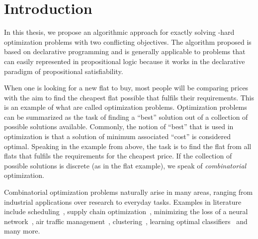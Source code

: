 \chapter{Introduction\label{chap:intro}}

In this thesis, we propose an algorithmic approach for exactly solving \NP-hard optimization problems with two conflicting objectives.
The algorithm proposed is based on declarative programming and is generally applicable to problems that can easily represented in propositional logic because it works in the declarative paradigm of propositional satisfiability.

When one is looking for a new flat to buy, most people will be comparing prices with the aim to find the cheapest flat possible that fulfils their requirements.
This is an example of what are called optimization problems.
Optimization problems can be summarized as the task of finding a ``best'' solution out of a collection of possible solutions available.
Commonly, the notion of ``best'' that is used in optimization is that a solution of minimum associated ``cost'' is considered optimal.
Speaking in the example from above, the task is to find the flat from all flats that fulfils the requirements for the cheapest price.
If the collection of possible solutions is discrete (as in the flat example), we speak of \emph{combinatorial} optimization.

Combinatorial optimization problems naturally arise in many areas, ranging from industrial applications over research to everyday tasks.
Examples in literature include scheduling~\autocites{DBLP:conf/cp/Stojadinovic14,DBLP:conf/cpaior/BofillGSV15,DBLP:journals/ior/Solomon87,DBLP:journals/candie/AkyolB07}, supply chain optimization~\autocite{}, minimizing the loss of a neural network~\autocite{}, air traffic management~\autocites{DBLP:journals/ior/BertsimasLO11,RichardsHow2002Aircrafttrajectoryplanning}, clustering~\autocite{DBLP:journals/ai/DaoDV17,DBLP:conf/sdm/DavidsonRS10}, learning optimal classifiers~\autocites{DBLP:conf/cp/MaliotovM18,DBLP:conf/ijcai/NarodytskaIPM18,DBLP:conf/ijcai/Hu0HH20,DBLP:conf/cp/YuISB20,DBLP:conf/aaai/DemirovicS21,DBLP:conf/cp/ShatiCM21} and many more.

